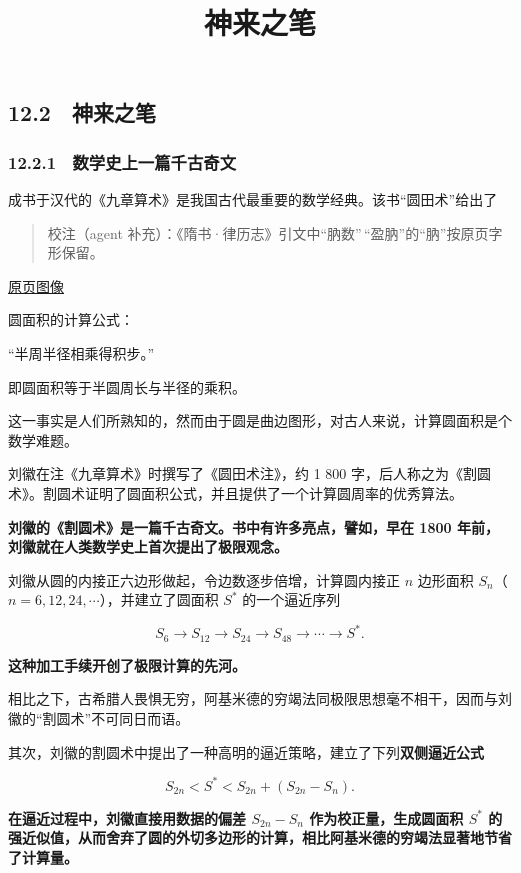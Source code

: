 \documentclass[
  10pt,
  fontset=fandol]{ctexart}
\title{神来之笔}
\author{}
\date{}
\begin{document}
\maketitle

\subsection{12.2　神来之笔}\label{ux795eux6765ux4e4bux7b14}

\subsubsection{12.2.1　数学史上一篇千古奇文}\label{ux6570ux5b66ux53f2ux4e0aux4e00ux7bc7ux5343ux53e4ux5947ux6587}

成书于汉代的《九章算术》是我国古代最重要的数学经典。该书``圆田术''给出了

\begin{quote}
校注（agent 补充）：《隋书·律历志》引文中``肭数''\,``盈肭''的``肭''按原页字形保留。
\end{quote}

\href{../../source-images/pdf-296.jpeg}{原页图像}

圆面积的计算公式：

``半周半径相乘得积步。''

即圆面积等于半圆周长与半径的乘积。

这一事实是人们所熟知的，然而由于圆是曲边图形，对古人来说，计算圆面积是个数学难题。

刘徽在注《九章算术》时撰写了《圆田术注》，约 1 800 字，后人称之为《割圆术》。割圆术证明了圆面积公式，并且提供了一个计算圆周率的优秀算法。

\textbf{刘徽的《割圆术》是一篇千古奇文。书中有许多亮点，譬如，早在 1800 年前，刘徽就在人类数学史上首次提出了极限观念。}

刘徽从圆的内接正六边形做起，令边数逐步倍增，计算圆内接正 \(n\) 边形面积 \(S_n\)（\(n=6,12,24,\cdots\)），并建立了圆面积 \(S^*\) 的一个逼近序列

\[
S_6\to S_{12}\to S_{24}\to S_{48}\to\cdots\to S^*.
\]

\textbf{这种加工手续开创了极限计算的先河。}

相比之下，古希腊人畏惧无穷，阿基米德的穷竭法同极限思想毫不相干，因而与刘徽的``割圆术''不可同日而语。

其次，刘徽的割圆术中提出了一种高明的逼近策略，建立了下列\textbf{双侧逼近公式}

\[
S_{2n}<S^*<S_{2n}+(S_{2n}-S_n).
\]

\textbf{在逼近过程中，刘徽直接用数据的偏差 \(S_{2n}-S_n\) 作为校正量，生成圆面积 \(S^*\) 的强近似值，从而舍弃了圆的外切多边形的计算，相比阿基米德的穷竭法显著地节省了计算量。}
\end{document}
